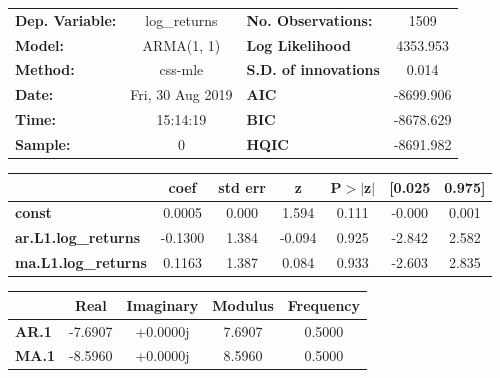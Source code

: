 \begin{center}
\begin{tabular}{lclc}
\toprule
\textbf{Dep. Variable:}     &        log\_returns       & \textbf{  No. Observations:  } &            1509            \\
\textbf{Model:}             &         ARMA(1, 1)        & \textbf{  Log Likelihood     } &          4353.953          \\
\textbf{Method:}            &          css-mle          & \textbf{  S.D. of innovations} &           0.014            \\
\textbf{Date:}              &      Fri, 30 Aug 2019     & \textbf{  AIC                } &         -8699.906          \\
\textbf{Time:}              &          15:14:19         & \textbf{  BIC                } &         -8678.629          \\
\textbf{Sample:}            &             0             & \textbf{  HQIC               } &         -8691.982          \\
\bottomrule
\end{tabular}
\begin{tabular}{lcccccc}
                            & \textbf{coef} & \textbf{std err} & \textbf{z} & \textbf{P$> |$z$|$} & \textbf{[0.025} & \textbf{0.975]}  \\
\midrule
\textbf{const}              &       0.0005  &        0.000     &     1.594  &         0.111        &       -0.000    &        0.001     \\
\textbf{ar.L1.log\_returns} &      -0.1300  &        1.384     &    -0.094  &         0.925        &       -2.842    &        2.582     \\
\textbf{ma.L1.log\_returns} &       0.1163  &        1.387     &     0.084  &         0.933        &       -2.603    &        2.835     \\
\bottomrule
\end{tabular}
\begin{tabular}{lcccc}
              & \textbf{            Real} & \textbf{         Imaginary} & \textbf{         Modulus} & \textbf{        Frequency}  \\
\midrule
\textbf{AR.1} &               -7.6907     &                +0.0000j     &                7.6907     &                0.5000       \\
\textbf{MA.1} &               -8.5960     &                +0.0000j     &                8.5960     &                0.5000       \\
\bottomrule
\end{tabular}
\end{center}
